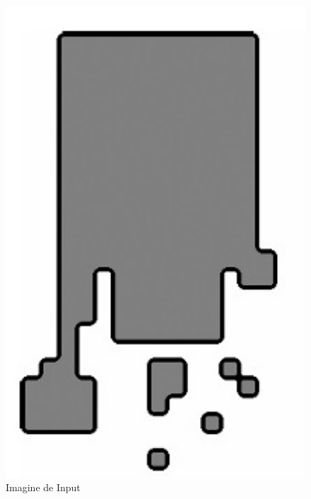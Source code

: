 \documentclass[a4paper,12pt]{report}
\begin{document}
\begin{figure}[h!]
    \centering
    \begin{minipage}{0.25\textwidth}
        \centering
        \includegraphics[width=1\textwidth]{images/input_erode.jpg}
        \caption{Imagine de Input}
    \end{minipage}
    \hspace{0.05\textwidth}
    \begin{minipage}{0.25\textwidth}
        \centering

\end{minipage}
\end{figure}
\end{document}
